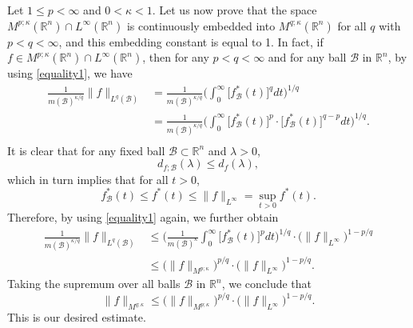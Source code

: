 \documentclass{birkjour}
\theoremstyle{definition}
\theoremstyle{remark}
\numberwithin{equation}{section}
\begin{document}
Let $1\leq p<\infty$ and $0<\kappa<1$. Let us now prove that the space $M^{p;\kappa}(\mathbb R^n)\cap L^\infty(\mathbb R^n)$ is continuously embedded into $M^{q;\kappa}(\mathbb R^n)$ for all $q$ with $p<q<\infty$, and this embedding constant is equal to 1. In fact, if $f\in M^{p;\kappa}(\mathbb R^n)\cap L^\infty(\mathbb R^n)$, then for any $p<q<\infty$ and for any ball $\mathcal{B}$ in $\mathbb R^n$, by using \eqref{equality1}, we have
\begin{equation*}
\begin{split}
\frac{1}{m(\mathcal{B})^{\kappa/q}}\|f\|_{L^{q}(\mathcal{B})}
&=\frac{1}{m(\mathcal{B})^{\kappa/q}}\bigg(\int_0^{\infty}\big[f^{*}_{\mathcal{B}}(t)\big]^qdt\bigg)^{1/q}\\
&=\frac{1}{m(\mathcal{B})^{\kappa/q}}
\bigg(\int_0^{\infty}\big[f^{*}_{\mathcal{B}}(t)\big]^p\cdot\big[f^{*}_{\mathcal{B}}(t)\big]^{q-p}dt\bigg)^{1/q}.\\
\end{split}
\end{equation*}
It is clear that for any fixed ball $\mathcal{B}\subset\mathbb R^n$ and $\lambda>0$,
\begin{equation*}
d_{f;\mathcal{B}}(\lambda)\leq d_{f}(\lambda),
\end{equation*}
which in turn implies that for all $t>0$,
\begin{equation*}
f^{*}_{\mathcal{B}}(t)\leq f^{*}(t)\leq \|f\|_{L^{\infty}}=\sup_{t>0}f^{*}(t).
\end{equation*}
Therefore, by using \eqref{equality1} again, we further obtain
\begin{equation*}
\begin{split}
\frac{1}{m(\mathcal{B})^{\kappa/q}}\|f\|_{L^{q}(\mathcal{B})}
&\leq\bigg(\frac{1}{m(\mathcal{B})^{\kappa}}\int_0^{\infty}\big[f^{*}_{\mathcal{B}}(t)\big]^pdt\bigg)^{1/q}
\cdot\big(\|f\|_{L^{\infty}}\big)^{1-p/q}\\
&\leq\big(\|f\|_{M^{p;\kappa}}\big)^{p/q}\cdot\big(\|f\|_{L^\infty}\big)^{1-p/q}.
\end{split}
\end{equation*}
Taking the supremum over all balls $\mathcal{B}$ in $\mathbb R^n$, we conclude that
\begin{equation*}
\|f\|_{M^{q;\kappa}}\leq\big(\|f\|_{M^{p;\kappa}}\big)^{p/q}\cdot\big(\|f\|_{L^\infty}\big)^{1-p/q}.
\end{equation*}
This is our desired estimate.
\end{document}
